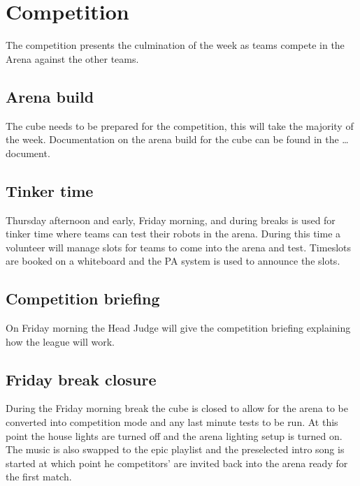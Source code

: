 \section{Competition}

The competition presents the culmination of the week as teams compete in the Arena against the other teams.

\subsection{Arena build}

The cube needs to be prepared for the competition, this will take the majority of the week.
Documentation on the arena build for the cube can be found in the \dots document.


\subsection{Tinker time}

Thursday afternoon and early, Friday morning, and during breaks is used for tinker time where teams can test their robots in the arena.
During this time a volunteer will manage slots for teams to come into the arena and test.
Timeslots are booked on a whiteboard and the PA system is used to announce the slots.

\subsection{Competition briefing}

On Friday morning the Head Judge will give the competition briefing explaining how the league will work.

\subsection{Friday break closure}

During the Friday morning break the cube is closed to allow for the arena to be converted into competition mode and any last minute tests to be run.
At this point the house lights are turned off and the arena lighting setup is turned on.
The music is also swapped to the epic playlist and the preselected intro song is started at which point he competitors' are invited back into the arena ready for the first match.

